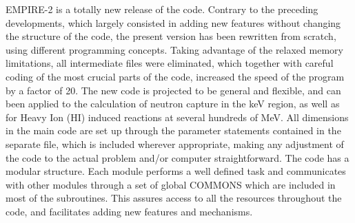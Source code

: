 \documentclass[twocolumn,amsmath,amssymb,10pt,groupedaddress,a4paper]{revtex4}
\begin{document}
EMPIRE-2 is a totally new release of the code. Contrary to the preceding
developments, which largely consisted in adding new features without
changing the structure of the code, the present version has been rewritten
from scratch, using different programming concepts. Taking advantage
of the relaxed memory limitations, all intermediate files were eliminated,
which together with careful coding of the most crucial parts of the
code, increased the speed of the program by a factor of 20. The new
code is projected to be general and flexible, and can been applied
to the calculation of neutron capture in the keV region, as well as
for Heavy Ion (HI) induced reactions at several hundreds of MeV. All
dimensions in the main code are set up through the parameter statements
contained in the separate file, which is included wherever appropriate,
making any adjustment of the code to the actual problem and/or computer
straightforward. The code has a modular structure. Each module performs
a well defined task and communicates with other modules through a
set of global COMMONS which are included in most of the subroutines.
This assures access to all the resources throughout the code, and
facilitates adding new features and mechanisms.
\end{document}

